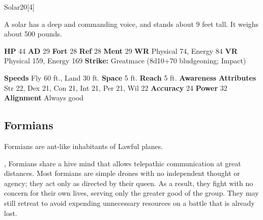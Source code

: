   \begin{monsubsection}{Solar}{20}[4]
    \vspace{-1em}\vspace{-1em}
    \vspace{0em}

    
          A solar has a deep and commanding voice, and stands about 9 feet tall. It weighs about 500 pounds.
        

    \begin{spellcontent}
      \begin{spelltargetinginfo}
        \pari \textbf{HP} 44 \monsep
          \textbf{AD} 29 \monsep
          \textbf{Fort} 28 \monsep
          \textbf{Ref} 28 \monsep
          \textbf{Ment} 29
        \pari \textbf{WR} Physical 74, Energy 84 \monsep
        \textbf{VR} Physical 159, Energy 169
        \pari \textbf{Strike:}
            Greatmace  (8d10+70 bludgeoning; Impact)
      \end{spelltargetinginfo}
    \end{spellcontent}
    \begin{monsterfooter}
      \pari \textbf{Speeds} Fly 60 ft., Land 30 ft. \monsep
        \textbf{Space} 5 ft. \monsep
        \textbf{Reach} 5 ft.
      \pari \textbf{Awareness} 
      \pari \textbf{Attributes}
        Str 22, Dex 21,
        Con 21, Int 21,
        Per 21, Wil 22
      \pari \textbf{Accuracy} 24 \monsep
        \textbf{Power} 32
      \pari \textbf{Alignment} Always good
    \end{monsterfooter}
  \end{monsubsection}
  
  
  
    \subsection{Formians}
      
      Formians are ant-like inhabitants of Lawful planes.
    
 ,
      Formians share a hive mind that allows telepathic communication at great distances.
      Most formians are simple drones with no independent thought or agency; they act only as directed by their queen.
      As a result, they fight with no concern for their own lives, serving only the greater good of the group.
      They may still retreat to avoid expending unnecessary resources on a battle that is already lost.
    
